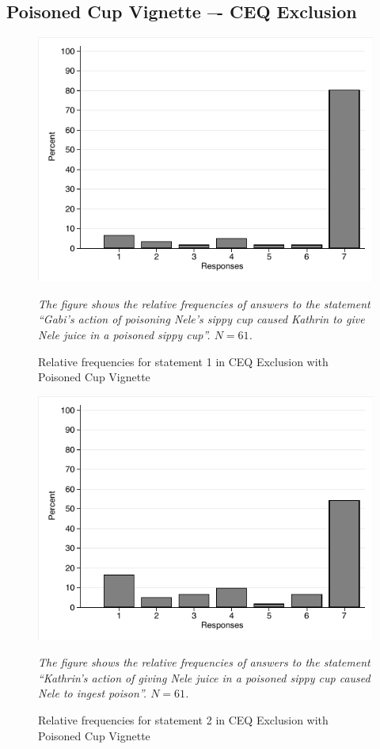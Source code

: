 \documentclass[egregdoesnotlikesansseriftitles,12pt]{scrartcl}
\begin{document}
\subsection{Poisoned Cup Vignette –- CEQ Exclusion}
\begin{figure}[H]
   \centering
   \includegraphics[scale=0.8]{figures/cup_ceq_hist_1.pdf}
   \begin{minipage}{0.9\linewidth}
   \footnotesize
   \emph{The figure shows the relative frequencies of answers to the statement ``Gabi's action of poisoning Nele's sippy cup caused Kathrin to give Nele juice in a poisoned sippy cup''. $N=61$.}
   \end{minipage}
   \caption{Relative frequencies for statement 1 in CEQ Exclusion with Poisoned Cup Vignette}
   \label{fig:cup_ceq_hist_1}
\end{figure}

\begin{figure}[H]
   \centering
   \includegraphics[scale=0.8]{figures/cup_ceq_hist_2.pdf}
   \begin{minipage}{0.9\linewidth}
   \footnotesize
   \emph{The figure shows the relative frequencies of answers to the statement ``Kathrin's action of giving Nele juice in a poisoned sippy cup caused Nele to ingest poison''. $N=61$.}
   \end{minipage}
   \caption{Relative frequencies for statement 2 in CEQ Exclusion with Poisoned Cup Vignette}
   \label{fig:cup_ceq_hist_2}
\end{figure}
\end{document}
